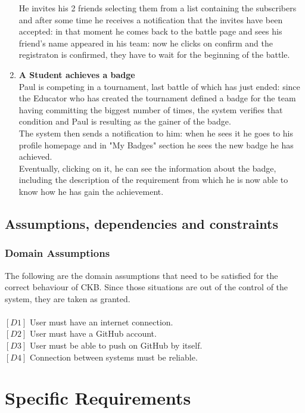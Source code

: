 \documentclass{article}
\begin{document}
\begin{enumerate}
  He invites his 2 friends selecting them from a list containing the subscribers and after some time he receives a notification that the invites have been accepted: in that moment he comes back to the battle page and sees his friend's name 
  appeared in his team: now he clicks on confirm and the registraton is confirmed, they have to wait for the beginning of the battle.
  \newpage 
  \item \textbf{A Student achieves a badge\\} Paul is competing in a tournament, last battle of which has just ended: since the Educator who has created the tournament defined a badge for the team 
  having committing the biggest number of times, the system verifies that condition and Paul is resulting as the gainer of the badge.\\
  The system then sends a notification to him: when he sees it he goes to his profile homepage and in "My Badges" section he sees the new badge he has achieved.\\
  Eventually, clicking on it, he can see the information about the badge, including the description of the requirement from which he is now able to know
  how he has gain the achievement.


\end{enumerate}

\subsection{Assumptions, dependencies and constraints}

\subsubsection{Domain Assumptions}
The following are the domain assumptions that need to be satisfied for the correct behaviour of CKB. Since those situations are out of the control of the system, they are taken as granted.\\\\
$[D1]$ User must have an internet connection.\\
$[D2]$ User must have a GitHub account.\\
$[D3]$ User must be able to push on GitHub by itself.\\
$[D4]$ Connection between systems must be reliable.\\

\section{Specific Requirements}
\end{document}
